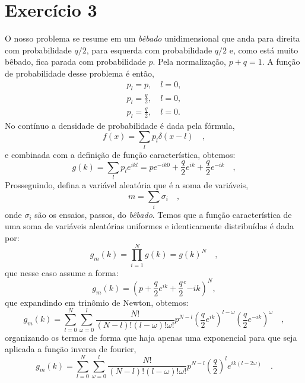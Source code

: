 \documentclass[12pt]{article}
\begin{document}
\section*{Exercício 3}
O nosso problema se resume em um \textit{bêbado} unidimensional que anda para direita com probabilidade $q/2$, para esquerda com probabilidade $q/2$ e, como está muito bêbado, fica parada com probabilidade $p$. Pela normalização, $p+q=1$. A função de probabilidade desse problema é então,
\begin{equation}
\begin{split}
p_l = p, \quad l=0, \\
p_l = \frac{q}{2}, \quad l=0,\\
p_l = \frac{q}{2}, \quad l=0.
\end{split}
\end{equation}
No contínuo a densidade de probabilidade é dada pela fórmula,
\begin{equation}
f(x) = \sum_l p_l\delta(x-l) \quad,
\end{equation}
e combinada com a definição de função característica, obtemos:
\begin{equation}
g(k) = \sum_l p_l e^{ikl} = pe^{-ik0} + \frac{q}{2}e^{ik} + \frac{q}{2}e^{-ik} \quad, 
\end{equation}
Prosseguindo, defina a variável aleatória que é a soma de variáveis,
\begin{equation}
m = \sum_i \sigma_i \quad,
\end{equation}
onde $\sigma_i$ são os ensaios, passos, do \textit{bêbado}. Temos que a função característica de uma soma de variáveis aleatórias uniformes e identicamente distribuídas é dada por:
\begin{equation}
g_m(k) = \prod\limits_{i=1}^N g(k) = g(k)^N \quad,  
\end{equation}
que nesse caso assume a forma:
\begin{equation}
g_m(k) = (p + \frac{q}{2}e^{ik} + \frac{q}{2}^e{-ik})^N,
\end{equation}
que expandindo em trinômio de Newton, obtemos:
\begin{equation}
g_m(k) = \sum\limits_{l=0}^N \sum\limits_{\omega=0}^l \frac{N!}{(N-l)!(l-\omega)!\omega !} p^{N-l} \left(\frac{q}{2}e^{ik}\right)^{l-\omega}\left(\frac{q}{2}e^{-ik}\right)^{\omega} \quad,
\end{equation}
organizando os termos de forma que haja apenas uma exponencial para que seja aplicada a função inversa de fourier,
\begin{equation}
g_m(k) = \sum\limits_{l=0}^N \sum\limits_{\omega=0}^l \frac{N!}{(N-l)!(l-\omega)!\omega !} p^{N-l} \left(\frac{q}{2}\right)^{l}e^{ik(l-2\omega)} \quad.
\end{equation}
\end{document}
